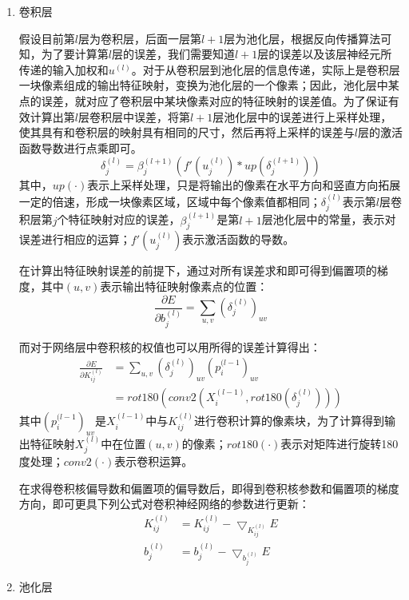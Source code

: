 \begin{enumerate}
\item 卷积层

假设目前第$l$层为卷积层，后面一层第$l+1$层为池化层，根据反向传播算法可知，为了要计算第$l$层的误差，我们需要知道$l+1$层的误差以及该层神经元所传递的输入加权和$u^{(l)}$。对于从卷积层到池化层的信息传递，实际上是卷积层一块像素组成的输出特征映射，变换为池化层的一个像素；因此，池化层中某点的误差，就对应了卷积层中某块像素对应的特征映射的误差值。为了保证有效计算出第$l$层卷积层中误差，将第$l+1$层池化层中的误差进行上采样处理，使其具有和卷积层的映射具有相同的尺寸，然后再将上采样的误差与$l$层的激活函数导数进行点乘即可。
\begin{equation}
\delta_{j}^{(l)} = \beta_{j}^{(l+1)} ( f'(u_{j}^{(l)}) * up(\delta_{j}^{(l+1)}))
\end{equation}
其中，$up(\cdot)$表示上采样处理，只是将输出的像素在水平方向和竖直方向拓展一定的倍速，形成一块像素区域，区域中每个像素值都相同；$\delta_{j}^{(l)}$表示第$l$层卷积层第$j$个特征映射对应的误差，$\beta_{j}^{(l+1)}$是第$l+1$层池化层中的常量，表示对误差进行相应的运算；$f'(u_{j}^{(l)})$表示激活函数的导数。

在计算出特征映射误差的前提下，通过对所有误差求和即可得到偏置项的梯度，其中$(u,v)$表示输出特征映射像素点的位置：
\begin{equation}
\frac{\partial E}{\partial b_{j}^{(l)}} = \sum_{u,v} (\delta_{j}^{(l)})_{uv}
\end{equation}

而对于网络层中卷积核的权值也可以用所得的误差计算得出：
\begin{align}
\frac{\partial E}{\partial K_{ij}^{(l)}} & = \sum_{u,v} (\delta_{j}^{(l)})_{uv} (p_{i}^{(l-1})_{uv} \\
					 & = rot180(conv2(X_{i}^{(l-1)}, rot180(\delta_{j}^{(l)})))
\end{align}
其中$(p_{i}^{(l-1})_{uv}$是$X_{i}^{(l-1)}$中与$K_{ij}^{(l)}$进行卷积计算的像素块，为了计算得到输出特征映射$X_{j}^{(l)}$中在位置$(u,v)$的像素；$rot180(\cdot)$表示对矩阵进行旋转180度处理；$conv2(\cdot)$表示卷积运算。

在求得卷积核偏导数和偏置项的偏导数后，即得到卷积核参数和偏置项的梯度方向，即可更具下列公式对卷积神经网络的参数进行更新：
\begin{align}
K_{ij}^{(l)} & = K_{ij}^{(l)} - \bigtriangledown_{K_{ij}^{(l)}} E \\
b_{j}^{(l)} & = b_{j}^{(l)} - \bigtriangledown_{b_{j}^{(l)}} E 
\end{align}
\item 池化层


\end{enumerate}
